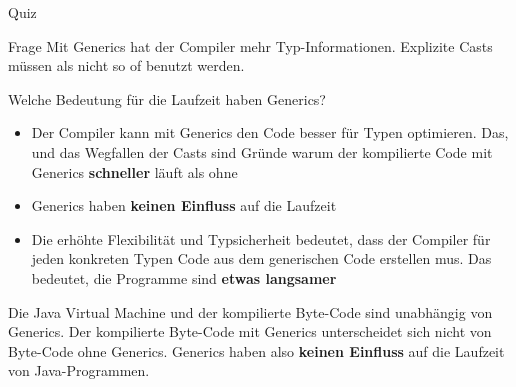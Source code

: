 \documentclass[usepdftitle=false,hyperref={pdfpagelabels=false}]{beamer}
\begin{document}
\begin{frame}{Quiz}
    \begin{block}{Frage}
        Mit Generics hat der Compiler mehr Typ-Informationen. Explizite
        Casts müssen als nicht so of benutzt werden.

        Welche Bedeutung für die Laufzeit haben Generics?
    \end{block}
    
    \begin{overprint}
    \begin{itemize}
        \item Der Compiler kann mit Generics den Code besser für
              Typen optimieren. Das, und das Wegfallen der Casts sind
              Gründe warum der kompilierte Code mit Generics
              \textbf{schneller} läuft als ohne
        \item Generics haben \textbf{keinen Einfluss} auf die Laufzeit
        \item Die erhöhte Flexibilität und Typsicherheit bedeutet, 
              dass der Compiler für jeden konkreten Typen Code aus
              dem generischen Code erstellen mus. Das bedeutet,
              die Programme sind \textbf{etwas langsamer}
    \end{itemize}
        Die Java Virtual Machine und der kompilierte Byte-Code sind
        unabhängig von Generics. Der kompilierte Byte-Code mit Generics
        unterscheidet sich nicht von Byte-Code ohne Generics. Generics
        haben also \textbf{keinen Einfluss} auf die Laufzeit von Java-Programmen.
    \end{overprint}
\end{frame}
\end{document}
